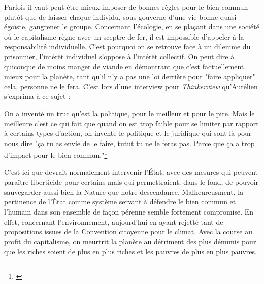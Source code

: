 \bigbreak

Parfois il vaut peut être mieux imposer de bonnes règles pour le bien commun plutôt que de laisser
chaque individu, sous gouverne d'une vie bonne quasi égoïste, gangrener le groupe. Concernant
l'écologie, en se plaçant dans une société où le capitalisme règne avec un sceptre de fer, il est
impossible d'appeler à la responsabilité individuelle. C'est pourquoi on se retrouve face à un
dilemme du prisonnier, l'intérêt individuel s'oppose à l'intérêt collectif. On peut dire à quiconque
de moins manger de viande en démontrant que c'est factuellement mieux pour la planète, tant qu'il
n'y a pas une loi derrière pour "faire appliquer" cela, personne ne le fera. C'est lors d'une
interview pour \textit{Thinkerview} qu'Aurélien \citeauthor{ThinkerviewBarrau} s'exprima à ce sujet
:

\begin{quoting}
    On a inventé un truc qu'est la politique, pour le meilleur et pour le pire. Mais le meilleure
    c'est ce qui fait que quand on est trop faible pour se limiter par rapport à certains types
    d'action, on invente le politique et le juridique qui sont là pour nous dire "ça tu as envie de
    le faire, tutut tu ne le feras pas. Parce que ça a trop d'impact pour le bien commun."\footnote{\cite{ThinkerviewBarrau} }
\end{quoting}

C'est ici que devrait normalement intervenir l'État, avec des mesures qui peuvent paraître
liberticide pour certains mais qui permettraient, dans le fond, de pouvoir sauvegarder aussi bien la
Nature que notre descendance. Malheureusment, la pertinence de l'État comme système servant à
défendre le bien commun et l'humain dans son ensemble de façon pérenne semble fortement compromise.
En effet, concernant l'environnement, aujourd'hui  en ayant rejetté tant de propositions issues
de la Convention citoyenne pour le climat. Avec la course au profit du capitalisme, on meurtrit la
planète au détriment des plus démunis pour que les riches soient de plus en plus riches et les
pauvres de plus en plus pauvres.